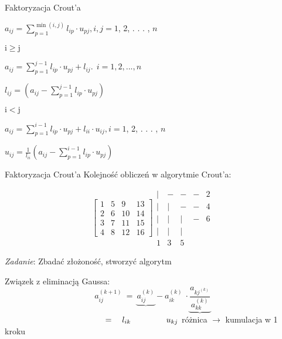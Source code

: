 \begin{frame}{ Faktoryzacja Crout'a}
\begin{flushright}
$a_{ij}= \displaystyle \sum_{p=1}^{\min(i,j)} l_{ip}\cdot 
u_{pj}, i, j=1$, 2, . . . , $n$
\end{flushright}
\begin{flushright}
$
\mathrm{i}\geq \mathrm{j}
$
\end{flushright}
\begin{flushright}
$a_{ij}=\displaystyle \sum_{p=1}^{j-1}l_{ip}\cdot u_{pj}+l_{ij}.\ \  i=1, 2, . . . , n$
\end{flushright}
\begin{flushright}
$l_{ij}=(a_{ij}-\sum_{p=1}^{j-1}l_{ip}\cdot u_{pj})$
\end{flushright}
\begin{flushright}
$
\mathrm{i}<\mathrm{j}
$
\end{flushright}

\begin{flushright}
$a_{ij}= \sum_{p=1}^{i-1}l_{ip}\cdot u_{pj}+l_{ii}\cdot u_{ij}, i=1$, 2, . . . , $n$
\end{flushright}
\begin{flushright}
$u_{ij}=\frac{1}{l_{ii}}(a_{ij}-\sum_{p=1}^{i-1}l_{ip}\cdot u_{pj})$
\end{flushright}
\end{frame}
\begin{frame}{ Faktoryzacja Crout'a}
Kolejność obliczeń w algorytmie Crout'a:

$$
\begin{bmatrix}
1 & 5 & 9 & 13\\
2 & 6 & 10 & 14\\
3 & 7 & 11 & 15\\
4 & 8 & 12 & 16
\end{bmatrix}
\begin{array}{lllll}
| & - & - &- & 2 \\
| & | & - & - & 4 \\
| & | & | & - & 6 \\
| & | & | \\
1 & 3 & 5 
\end{array}
$$
\begin{flushright}

{\it Zadanie}: Zbadać złożoność, stworzyć algorytm
\end{flushright}
Związek z eliminacją Gaussa:
$$
a_{ij}^{(k+1)}\ =\ \underbrace{a_{ij}^{(k)}} -a_{ik}^{(k)}\ \cdot \underbrace{\frac{a_{kj^{(k)}}}{a_{kk}^{(k)}}}
$$
$ \hspace{43mm} =\ \ \  l_{ik}\ \ \ \ \ \ \ \ \ \ \ \ \ u_{kj}
$
\newline \hspace*{30mm} różnica $\rightarrow$ kumulacja w 1 kroku

\end{frame}
